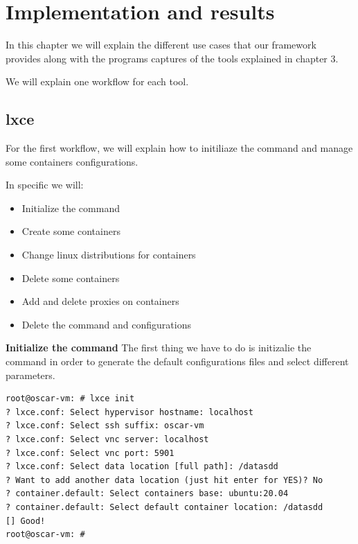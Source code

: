 \clearpage\section{Implementation and results}

In this chapter we will explain the different use cases that our framework provides along with the programs captures of the tools explained in chapter 3.

We will explain one workflow for each tool.

\subsection{lxce}
For the first workflow, we will explain how to initiliaze the command and manage some containers configurations.

In specific we will:
\begin{itemize}
	\item{Initialize the command}
	\item{Create some containers}
	\item{Change linux distributions for containers}
	\item{Delete some containers}
	\item{Add and delete proxies on containers}
	\item{Delete the command and configurations}
\end{itemize}

\textbf{Initialize the command}
The first thing we have to do is initizalie the command in order to generate the default configurations files and select different parameters.

\begin{verbatim}
root@oscar-vm: # lxce init
? lxce.conf: Select hypervisor hostname: localhost
? lxce.conf: Select ssh suffix: oscar-vm
? lxce.conf: Select vnc server: localhost
? lxce.conf: Select vnc port: 5901
? lxce.conf: Select data location [full path]: /datasdd
? Want to add another data location (just hit enter for YES)? No
? container.default: Select containers base: ubuntu:20.04
? container.default: Select default container location: /datasdd
[] Good!
root@oscar-vm: #
\end{verbatim}

